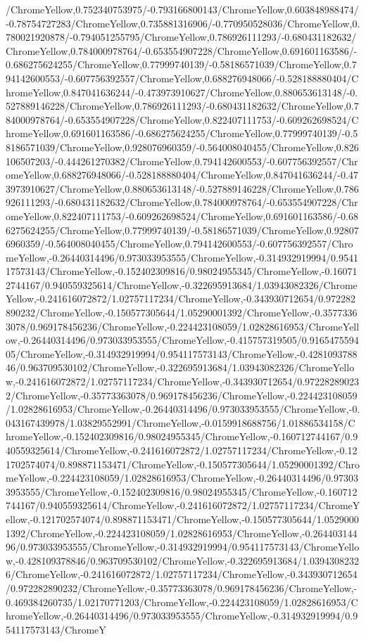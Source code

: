 {\begin{tikzternal}
{/ChromeYellow,0.752340753975/-0.793166800143/ChromeYellow,0.603848988474/-0.78754727283/ChromeYellow,0.735881316906/-0.770950528036/ChromeYellow,0.780021920878/-0.794051255795/ChromeYellow,0.786926111293/-0.680431182632/ChromeYellow,0.784000978764/-0.653554907228/ChromeYellow,0.691601163586/-0.686275624255/ChromeYellow,0.77999740139/-0.58186571039/ChromeYellow,0.794142600553/-0.607756392557/ChromeYellow,0.688276948066/-0.528188880404/ChromeYellow,0.847041636244/-0.473973910627/ChromeYellow,0.880653613148/-0.527889146228/ChromeYellow,0.786926111293/-0.680431182632/ChromeYellow,0.784000978764/-0.653554907228/ChromeYellow,0.822407111753/-0.609262698524/ChromeYellow,0.691601163586/-0.686275624255/ChromeYellow,0.77999740139/-0.58186571039/ChromeYellow,0.928076960359/-0.564008040455/ChromeYellow,0.826106507203/-0.444261270382/ChromeYellow,0.794142600553/-0.607756392557/ChromeYellow,0.688276948066/-0.528188880404/ChromeYellow,0.847041636244/-0.473973910627/ChromeYellow,0.880653613148/-0.527889146228/ChromeYellow,0.786926111293/-0.680431182632/ChromeYellow,0.784000978764/-0.653554907228/ChromeYellow,0.822407111753/-0.609262698524/ChromeYellow,0.691601163586/-0.686275624255/ChromeYellow,0.77999740139/-0.58186571039/ChromeYellow,0.928076960359/-0.564008040455/ChromeYellow,0.794142600553/-0.607756392557/ChromeYellow,-0.26440314496/0.973033953555/ChromeYellow,-0.314932919994/0.954117573143/ChromeYellow,-0.152402309816/0.98024955345/ChromeYellow,-0.160712744167/0.940559325614/ChromeYellow,-0.322695913684/1.03943082326/ChromeYellow,-0.241616072872/1.02757117234/ChromeYellow,-0.343930712654/0.972282890232/ChromeYellow,-0.150577305644/1.05290001392/ChromeYellow,-0.35773363078/0.969178456236/ChromeYellow,-0.224423108059/1.02828616953/ChromeYellow,-0.26440314496/0.973033953555/ChromeYellow,-0.415757319505/0.916547559405/ChromeYellow,-0.314932919994/0.954117573143/ChromeYellow,-0.428109378846/0.963709530102/ChromeYellow,-0.322695913684/1.03943082326/ChromeYellow,-0.241616072872/1.02757117234/ChromeYellow,-0.343930712654/0.972282890232/ChromeYellow,-0.35773363078/0.969178456236/ChromeYellow,-0.224423108059/1.02828616953/ChromeYellow,-0.26440314496/0.973033953555/ChromeYellow,-0.043167439978/1.03829552991/ChromeYellow,-0.0159918688756/1.01886534158/ChromeYellow,-0.152402309816/0.98024955345/ChromeYellow,-0.160712744167/0.940559325614/ChromeYellow,-0.241616072872/1.02757117234/ChromeYellow,-0.121702574074/0.898871153471/ChromeYellow,-0.150577305644/1.05290001392/ChromeYellow,-0.224423108059/1.02828616953/ChromeYellow,-0.26440314496/0.973033953555/ChromeYellow,-0.152402309816/0.98024955345/ChromeYellow,-0.160712744167/0.940559325614/ChromeYellow,-0.241616072872/1.02757117234/ChromeYellow,-0.121702574074/0.898871153471/ChromeYellow,-0.150577305644/1.05290001392/ChromeYellow,-0.224423108059/1.02828616953/ChromeYellow,-0.26440314496/0.973033953555/ChromeYellow,-0.314932919994/0.954117573143/ChromeYellow,-0.428109378846/0.963709530102/ChromeYellow,-0.322695913684/1.03943082326/ChromeYellow,-0.241616072872/1.02757117234/ChromeYellow,-0.343930712654/0.972282890232/ChromeYellow,-0.35773363078/0.969178456236/ChromeYellow,-0.469384260735/1.02170771203/ChromeYellow,-0.224423108059/1.02828616953/ChromeYellow,-0.26440314496/0.973033953555/ChromeYellow,-0.314932919994/0.954117573143/ChromeY}
\end{tikzternal}}
